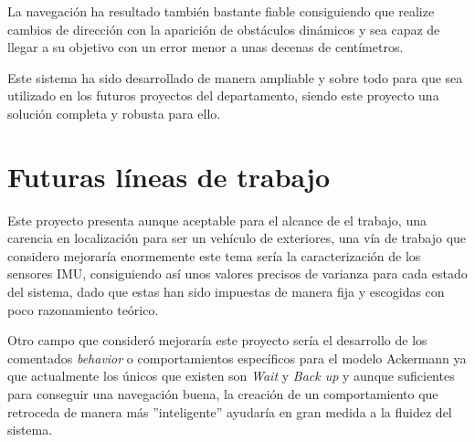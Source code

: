 La navegación ha resultado también bastante fiable consiguiendo que realize cambios de dirección con la aparición de obstáculos dinámicos y sea capaz de 
llegar a su objetivo con un error menor a unas decenas de centímetros.

Este sistema ha sido desarrollado de manera ampliable y sobre todo para que sea utilizado en los futuros proyectos del departamento, 
siendo este proyecto una solución completa y robusta para ello.

\chapter{Futuras líneas de trabajo}

Este proyecto presenta aunque aceptable para el alcance de el trabajo, una carencia en localización para ser un vehículo de exteriores, 
una vía de trabajo que considero mejoraría enormemente este tema sería la caracterización de los sensores IMU, consiguiendo así unos 
valores precisos de varianza para cada estado del sistema, dado que estas han sido impuestas de manera fija y escogidas con poco 
razonamiento teórico.

Otro campo que consideró mejoraría este proyecto sería el desarrollo de los comentados \textit{behavior} o comportamientos específicos para 
el modelo Ackermann ya que actualmente los únicos que existen son \textit{Wait} y \textit{Back up} y aunque suficientes para conseguir una navegación buena,
la creación de un comportamiento que retroceda de manera más ''inteligente'' ayudaría en gran medida a la fluidez del sistema.

